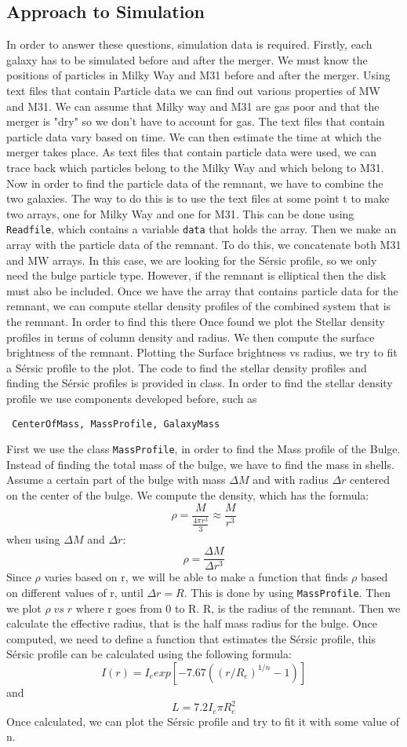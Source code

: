 \documentclass[linenumbers, preprint, times]{aastex631}
\begin{document}
\subsection{Approach to Simulation}
In order to answer these questions, simulation data is required. Firstly, each galaxy has to be simulated before and after the merger. We must know the positions of particles in Milky Way and M31 before and after the merger. Using text files that contain Particle data we can find out various properties of MW and M31. We can assume that Milky way and M31 are gas poor and that the merger is "dry" so we don't have to account for gas. The text files that contain particle data vary based on time. We can then estimate the time at which the merger takes place. As text files that contain particle data were used, we can trace back which particles belong to the Milky Way and which belong to M31. Now in order to find the particle data of the remnant, we have to combine the two galaxies. The way to do this is to use the text files at some point t to make two arrays, one for Milky Way and one for M31. This can be done using \verb+Readfile+, which contains a variable \verb+data+ that holds the array.
Then we make an array with the particle data of the remnant. To do this, we concatenate both M31 and MW arrays. In this case, we are looking for the Sérsic profile, so we only need the bulge particle type. However, if the remnant is elliptical then the disk must also be included. Once we have the array that contains particle data for the remnant, we can compute stellar density profiles of the combined system that is the remnant. In order to find this there
Once found we plot the Stellar density profiles in terms of column density and radius. We then compute the surface brightness of the remnant. Plotting the Surface brightness vs radius, we try to fit a Sérsic profile to the plot. The code to find the stellar density profiles and finding the Sérsic profiles is provided in class. In order to find the stellar density profile we use components developed before, such as \begin{verbatim} CenterOfMass, MassProfile, GalaxyMass \end{verbatim} First we use the class \verb+MassProfile+, in order to find the Mass profile of the Bulge. Instead of finding the total mass of the bulge, we have to find the mass in shells. Assume a certain part of the bulge with mass $\Delta M$ and with radius $\Delta r$ centered on the center of the bulge. We compute the density, which has the formula: \[\rho =  \frac{M}{\frac{4\pi r^3}{3}} \approx\frac{M}{r^3}\] when using $\Delta M$ and $\Delta r$:
\[\rho = \frac{\Delta M}{\Delta r^3}\] Since $\rho$ varies based on r, we will be able to make a function that finds $\rho$ based on different values of r, until $\Delta r = R$. This is done by using \verb+MassProfile+.
Then we plot $\rho\;vs\;r$ where r goes from 0 to R. R, is the radius of the remnant. Then we calculate the effective radius, that is the half mass radius for the bulge. Once computed, we need to define a function that estimates the Sérsic profile, this Sérsic profile can be calculated using the following formula: \[
I(r) = I_e exp{[-7.67 ( (r/R_e)^{1/n} - 1)]}
\] and \[L = 7.2 I_e \pi R_e^2\] Once calculated, we can plot the Sérsic profile and try to fit it with some value of n.
\end{document}
